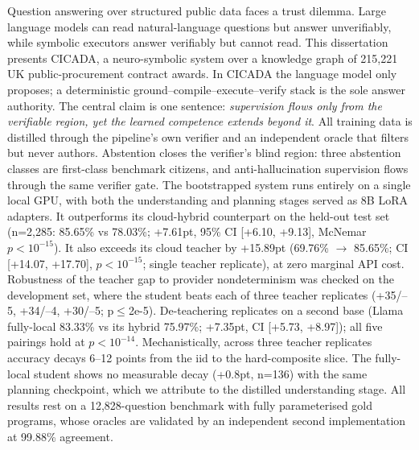 
Question answering over structured public data faces a trust dilemma. Large language models can read natural-language questions but answer unverifiably, while symbolic executors answer verifiably but cannot read. This dissertation presents CICADA, a neuro-symbolic system over a knowledge graph of 215,221 UK public-procurement contract awards. In CICADA the language model only proposes; a deterministic ground--compile--execute--verify stack is the sole answer authority. The central claim is one sentence: \emph{supervision flows only from the verifiable region, yet the learned competence extends beyond it}. All training data is distilled through the pipeline's own verifier and an independent oracle that filters but never authors. Abstention closes the verifier's blind region: three abstention classes are first-class benchmark citizens, and anti-hallucination supervision flows through the same verifier gate. The bootstrapped system runs entirely on a single local GPU, with both the understanding and planning stages served as 8B LoRA adapters. It outperforms its cloud-hybrid counterpart on the held-out test set (n=2,285: 85.65\% vs 78.03\%; +7.61pt, 95\% CI [+6.10, +9.13], McNemar $p<10^{-15}$). It also exceeds its cloud teacher by +15.89pt (69.76\% $\rightarrow$ 85.65\%; CI [+14.07, +17.70], $p<10^{-15}$; single teacher replicate), at zero marginal API cost. Robustness of the teacher gap to provider nondeterminism was checked on the development set, where the student beats each of three teacher replicates (+35/--5, +34/--4, +30/--5; p$\leq$2e-5). De-teachering replicates on a second base (Llama fully-local 83.33\% vs its hybrid 75.97\%; +7.35pt, CI [+5.73, +8.97]); all five pairings hold at $p<10^{-14}$. Mechanistically, across three teacher replicates accuracy decays 6--12 points from the iid to the hard-composite slice. The fully-local student shows no measurable decay (+0.8pt, n=136) with the same planning checkpoint, which we attribute to the distilled understanding stage. All results rest on a 12,828-question benchmark with fully parameterised gold programs, whose oracles are validated by an independent second implementation at 99.88\% agreement.
